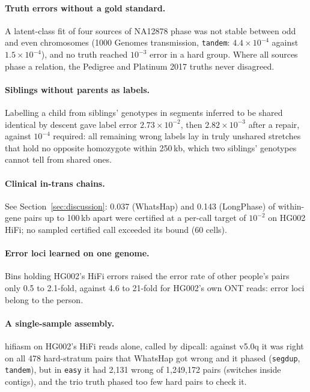 \documentclass[11pt]{article}
\theoremstyle{definition}
\theoremstyle{remark}
\begin{document}
\paragraph{Truth errors without a gold standard.} A latent-class fit of
four sources of NA12878 phase was not stable between odd and even
chromosomes (1000 Genomes transmission, \texttt{tandem}: $4.4\times10^{-4}$
against $1.5\times10^{-4}$), and no truth reached $10^{-3}$ error in a hard
group. Where all sources phase a relation, the Pedigree and Platinum 2017
truths never disagreed.

\paragraph{Siblings without parents as labels.} Labelling a child from
siblings' genotypes in segments inferred to be shared identical by descent
gave label error $2.73\times10^{-2}$, then $2.82\times10^{-3}$ after a
repair, against $10^{-4}$ required: all remaining wrong labels lay in truly
unshared stretches that hold no opposite homozygote within 250\,kb, which
two siblings' genotypes cannot tell from shared ones.

\paragraph{Clinical in-trans chains.} See Section~\ref{sec:discussion}: 0.037
(WhatsHap) and 0.143 (LongPhase) of within-gene pairs up to 100\,kb apart
were certified at a per-call target of $10^{-2}$ on HG002 HiFi; no sampled
certified call exceeded its bound (60 cells).

\paragraph{Error loci learned on one genome.} Bins holding HG002's HiFi
errors raised the error rate of other people's pairs only 0.5 to 2.1-fold,
against 4.6 to 21-fold for HG002's own ONT reads: error loci belong to the
person.

\paragraph{A single-sample assembly.} hifiasm on HG002's HiFi reads alone,
called by dipcall: against v5.0q it was right on all 478 hard-stratum pairs
that WhatsHap got wrong and it phased (\texttt{segdup}, \texttt{tandem}),
but in \texttt{easy} it had 2{,}131 wrong of 1{,}249{,}172 pairs (switches
inside contigs), and the trio truth phased too few hard pairs to check it.
\end{document}
